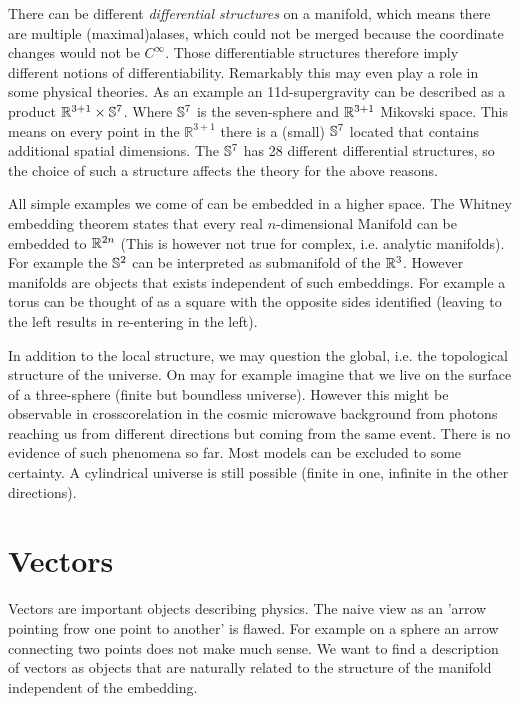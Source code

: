 \begin{sidenote}
There can be different \emph{differential structures} on a manifold, 
which means there are multiple (maximal)alases, which
could not be merged because the coordinate changes would not be $C^\infty$. Those differentiable structures therefore imply different notions of differentiability. 
Remarkably this may even play a role in some physical theories. 
As an example an 11d-supergravity can be described as a product
$\mathbb{R}^{3+1}\times \mathbb{S}^7$.
Where $\mathbb{S}^7$ is the seven-sphere and $\mathbb{R}^{3+1}$ Mikovski space.
This means on every point in the $\mathbb{R}^{3+1}$ there is a (small) $\mathbb{S}^7$  located that contains additional spatial dimensions. 
The $\mathbb{S}^7$ has 28 different differential structures, so the choice of
such a structure affects the theory for the above reasons.
\end{sidenote}
All simple examples we come of can be embedded in a higher space. The Whitney
embedding theorem states that every real $n$-dimensional Manifold
can be embedded to $\mathbb{R}^{2n}$ (This is however not true for complex, i.e. analytic manifolds).
For example the $\mathbb{S}^2$ can be interpreted as submanifold of the $\mathbb{R}^3$.
However manifolds are objects that exists independent of such embeddings. 
For example a torus can be thought of as a square with the opposite sides identified (leaving to the left results in re-entering in the left).
\begin{sidenote}
In addition to the local structure, we may question the global, i.e. the
topological structure of the universe.
On may for example imagine that we live on the surface of a three-sphere (finite
but boundless universe).
However this might be observable in crosscorelation in the cosmic microwave background from photons reaching us 
from different directions but coming from the same event. There is no evidence of such phenomena so far. 
Most models can be excluded to some certainty. A cylindrical
universe is still possible (finite in one, infinite in the
other directions).
\end{sidenote}
\section{Vectors}
Vectors are important objects describing physics. The naive view as an 'arrow
pointing frow one point to another' is flawed.
For example on a sphere an arrow connecting two points does not make much sense.
We want to find a description of vectors as objects that are naturally related to the structure of the manifold independent of the embedding.

